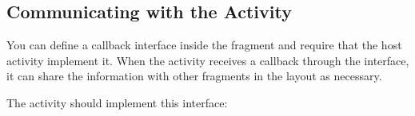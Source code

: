 \subsection{Communicating with the Activity}
You can  define a callback interface inside the fragment and require that the host activity implement it. When the activity receives a callback through the interface, it can share the information with other fragments in the layout as necessary.



The activity should implement this interface:


